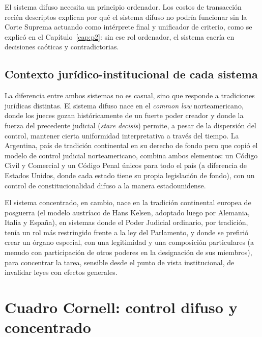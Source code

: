 \documentclass[12pt,oneside]{book}
\begin{document}
\begin{impbox}
El sistema difuso necesita un principio ordenador. Los costos de transacción
recién descriptos explican por qué el sistema difuso no podría funcionar sin la
Corte Suprema actuando como intérprete final y unificador de criterio, como se
explicó en el Capítulo~\ref{cap:p2}: sin ese rol ordenador, el sistema caería en
decisiones caóticas y contradictorias.
\end{impbox}

\subsection{Contexto jurídico-institucional de cada sistema}

La diferencia entre ambos sistemas no es casual, sino que responde a tradiciones
jurídicas distintas. El sistema difuso nace en el \textit{common law}
norteamericano, donde los jueces gozan históricamente de un fuerte poder creador y
donde la fuerza del precedente judicial (\textit{stare decisis}) permite, a pesar
de la dispersión del control, mantener cierta uniformidad interpretativa a través
del tiempo. La Argentina, país de tradición continental en su derecho de fondo pero
que copió el modelo de control judicial norteamericano, combina ambos elementos: un
Código Civil y Comercial y un Código Penal únicos para todo el país (a diferencia
de Estados Unidos, donde cada estado tiene su propia legislación de fondo), con un
control de constitucionalidad difuso a la manera estadounidense.

El sistema concentrado, en cambio, nace en la tradición continental europea de
posguerra (el modelo austríaco de Hans Kelsen, adoptado luego por Alemania,
Italia y España), en sistemas donde el Poder Judicial ordinario, por tradición,
tenía un rol más restringido frente a la ley del Parlamento, y donde se prefirió
crear un órgano especial, con una legitimidad y una composición particulares
(a menudo con participación de otros poderes en la designación de sus miembros),
para concentrar la tarea, sensible desde el punto de vista institucional, de
invalidar leyes con efectos generales.

\section{Cuadro Cornell: control difuso y concentrado}
\end{document}
